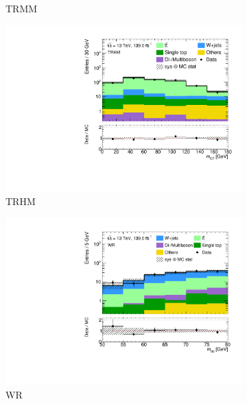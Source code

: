 \begin{figure}
\begin{subfigure}[b]{0.5\linewidth}
		\caption{TRMM\label{fig:signal_contamination_TRMM}}
	\end{subfigure}\hfill
	\begin{subfigure}[b]{0.5\linewidth}
		\centering\includegraphics[width=1.0\textwidth]{1Lbb_TRHM_mct}
		\caption{TRHM\label{fig:signal_contamination_TRHM}}
	\end{subfigure}\hfill
	\begin{subfigure}[b]{0.5\linewidth}
		\centering\includegraphics[width=1.0\textwidth]{1Lbb_WR_mbb}
		\caption{WR\label{fig:signal_contamination_WR}}
	\end{subfigure}\hfill
	\begin{subfigure}[b]{0.5\linewidth}

\end{subfigure}
\end{figure}
